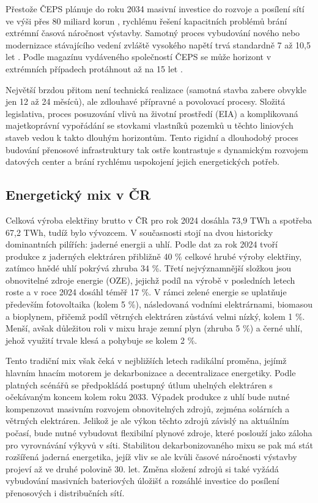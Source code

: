 Přestože ČEPS plánuje do roku 2034 masivní investice do rozvoje a posílení sítí ve výši přes 80 miliard korun \cite{klimova_grid_2025}, rychlému řešení kapacitních problémů brání extrémní časová náročnost výstavby. Samotný proces vybudování nového nebo modernizace stávajícího vedení zvláště vysokého napětí trvá standardně 7 až 10,5 let \cite{vlcek_energeticky_2012}. Podle magazínu vydáveného společností ČEPS se může horizont v extrémních případech protáhnout až na 15 let \cite[s. 23]{klimova_grid_2025}.

Největší brzdou přitom není technická realizace (samotná stavba zabere obvykle jen 12 až 24 měsíců), ale zdlouhavé přípravné a povolovací procesy. Složitá legislativa, proces posuzování vlivů na životní prostředí (EIA) a komplikovaná majetkoprávní vypořádání se stovkami vlastníků pozemků u těchto liniových staveb vedou k takto dlouhým horizontům. Tento rigidní a dlouhodobý proces budování přenosové infrastruktury tak ostře kontrastuje s dynamickým rozvojem datových center a brání rychlému uspokojení jejich energetických potřeb. \cite{klimova_grid_2025, vlcek_energeticky_2012}


\subsection{Energetický mix v ČR}
\label{subsec:cz_energie_mix}

Celková výroba elektřiny brutto v ČR pro rok 2024 dosáhla 73,9 TWh a spotřeba 67,2 TWh, tudíž bylo vývozcem. V současnosti stojí na dvou historicky dominantních pilířích: jaderné energii a uhlí. Podle dat za rok 2024 tvoří produkce z jaderných elektráren přibližně 40 \% celkové hrubé výroby elektřiny, zatímco hnědé uhlí pokrývá zhruba 34 \%. Třetí nejvýznamnější složkou jsou obnovitelné zdroje energie (OZE), jejichž podíl na výrobě v posledních letech roste a v roce 2024 dosáhl téměř 17 \%. V rámci zelené energie se uplatňuje především fotovoltaika (kolem 5 \%), následovaná vodními elektrárnami, biomasou a bioplynem, přičemž podíl větrných elektráren zůstává velmi nízký, kolem 1 \%. Menší, avšak důležitou roli v mixu hraje zemní plyn (zhruba 5 \%) a černé uhlí, jehož využití trvale klesá a pohybuje se kolem 2 \%. \cite{energeticky_regulacni_urad_rocni_2025}

Tento tradiční mix však čeká v nejbližších letech radikální proměna, jejímž hlavním hnacím motorem je dekarbonizace a decentralizace energetiky. Podle platných scénářů se předpokládá postupný útlum uhelných elektráren s očekávaným koncem kolem roku 2033. Výpadek produkce z uhlí bude nutné kompenzovat masivním rozvojem obnovitelných zdrojů, zejména solárních a větrných elektráren. Jelikož je ale výkon těchto zdrojů závislý na aktuálním počasí, bude nutné vybudovat flexibilní plynové zdroje, které poslouží jako záloha pro vyrovnávání výkyvů v síti. Stabilitou dekarbonizovaného mixu se pak má stát rozšířená jaderná energetika, jejíž vliv se ale kvůli časové náročnosti výstavby projeví až ve druhé polovině 30. let. Změna složení zdrojů si také vyžádá vybudování masivních bateriových úložišť a rozsáhlé investice do posílení přenosových i distribučních sítí. \cite{bartos_energetika_2025}


